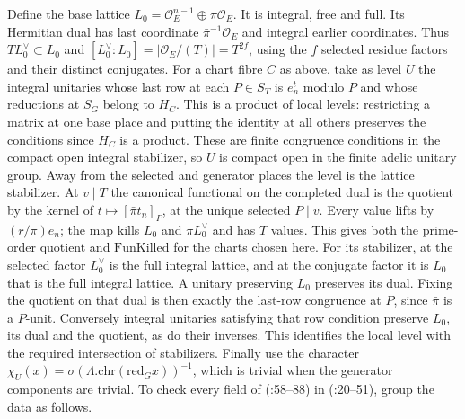Define the base lattice $L_0=\mathcal O_E^{n-1}\oplus\pi\mathcal O_E$.
It is integral, free and full. Its Hermitian dual has last coordinate
$\bar\pi^{-1}\mathcal O_E$ and integral earlier coordinates. Thus
$TL_0^\vee\subset L_0$ and $[L_0^\vee:L_0]=|\mathcal O_E/(T)|=T^{2f}$,
using the $f$ selected residue factors and their distinct conjugates.
For a chart fibre $C$ as above, take as level $U$ the integral unitaries
whose last row at each $P\in S_T$ is $e_n^t$ modulo $P$ and whose
reductions at $S_G$ belong to $H_C$. This is a product of local levels:
restricting a matrix at one base place and putting the identity at all
others preserves the conditions since $H_C$ is a product. These are
finite congruence conditions in the compact open integral stabilizer,
so $U$ is compact open in the finite adelic unitary group. Away from
the selected and generator places the level is the lattice stabilizer.
At $v\mid T$ the canonical functional on the completed dual is the
quotient by the kernel of $t\mapsto[\bar\pi t_n]_P$, at the unique
selected $P\mid v$. Every value lifts by $(r/\bar\pi)e_n$; the map
kills $L_0$ and $\pi L_0^\vee$ and has $T$ values. This gives both the
prime-order quotient and $\mathrm{FunKilled}$ for the charts chosen here.
For its stabilizer, at the selected factor $L_0^\vee$ is the full integral
lattice, and at the conjugate factor it is $L_0$ that is the full
integral lattice. A unitary preserving $L_0$ preserves its dual.
Fixing the quotient on that dual is then exactly the last-row congruence
at $P$, since $\bar\pi$ is a $P$-unit. Conversely integral unitaries
satisfying that row condition preserve $L_0$, its dual and the quotient,
as do their inverses. This identifies the local level with the required
intersection of stabilizers. Finally use the character
$\chi_U(x)=\sigma(\Lambda.\mathrm{chr}(\mathrm{red}_G x))^{-1}$,
which is trivial when the generator components are trivial. To check
every field of  (:58--88)
in  (:20--51), group the data as follows.
